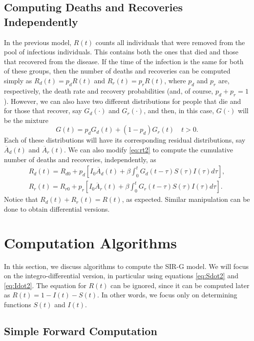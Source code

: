 \documentclass[USenglish,10pt]{article}
\newcommand{\Ab}{\overline{A}\xspace}
\begin{document}
\subsection{Computing Deaths and Recoveries Independently}

In the previous model, $R(t)$ counts all individuals that were removed from the pool of infectious individuals. This contains both the ones that died and those that recovered from the disease. If the time of the infection is the same for both of these groups, then the number of deaths and recoveries can be computed simply as $R_d(t)=p_dR(t)$ and $R_r(t)=p_rR(t)$, where $p_d$ and $p_r$ are, respectively, the death rate and recovery probabilities (and, of course, $p_d+p_r=1$).
However, we can also have  two different distributions for people that die and for those that recover, say $G_d(\cdot)$ and $G_r(\cdot)$, and then, in this case, $G(\cdot)$ will be the mixture
\[ G(t) = p_dG_d(t) + (1-p_d)G_r(t) \quad t>0.\]
Each of these distributions will have its corresponding residual distributions, say $\Ab_d(t)$ and $\Ab_r(t)$.
We can also modify \eqref{eq:rt2} to compute the cumulative number of deaths and recoveries, independently, as
\begin{equation*}
	\begin{gathered}
		R_d(t) = R_{d0} + p_d\left[I_0\Ab_d(t) + \beta \int_0^t G_d(t-\tau) S(\tau)I(\tau)d\tau\right], \\
		R_r(t) = R_{r0} + p_r\left[I_0\Ab_r(t) + \beta \int_0^t G_r(t-\tau) S(\tau)I(\tau)d\tau\right].
	\end{gathered}
\end{equation*}
Notice that $R_d(t) + R_r(t) = R(t)$, as expected. Similar manipulation can be done to obtain differential versions.


\section{Computation Algorithms}\label{sc:algorithm}

In this section, we discuss algorithms to compute the SIR-G model. We will focus on the integro-differential version, in particular using equations \eqref{eq:Sdot2} and \eqref{eq:Idot2}. The equation for $R(t)$ can be ignored, since it can be computed later as $R(t)=1-I(t)-S(t)$. In other words, we focus only on determining functions $S(t)$ and $I(t)$.

\subsection{Simple Forward Computation}
\end{document}
